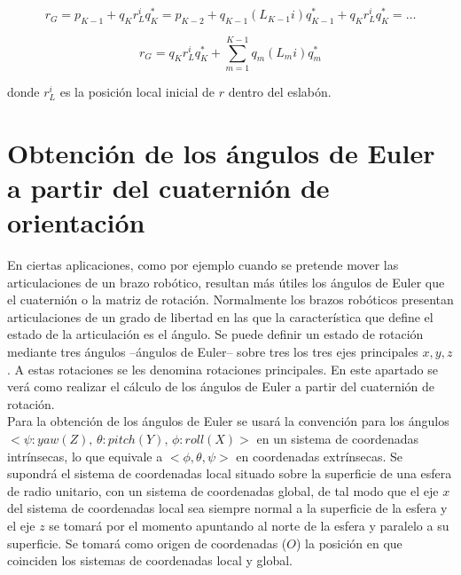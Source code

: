 \documentclass[12pt, a4paper]{report}
\begin{document}
$$ r_G = p_{K-1} + q_Kr_L^iq_K^* = p_{K-2} +  q_{K-1} (L_{K-1}i) q_{K-1}^* + q_K r_L^i q_K^* = \ldots $$

\begin{equation}
r_G = q_Kr_L^iq_K^* + \sum\limits_{m = 1}^{K-1} q_m (L_mi) q_m^*
\end{equation}

donde $r_L^i$ es la posición local inicial de $r$ dentro del eslabón.

\section{Obtención de los ángulos de Euler a partir del cuaternión de orientación}

En ciertas aplicaciones, como por ejemplo cuando se pretende mover las articulaciones de un brazo robótico, resultan más útiles los ángulos de Euler que el cuaternión o la matriz de rotación. Normalmente los brazos robóticos presentan articulaciones de un grado de libertad en las que la característica que define el estado de la articulación es el ángulo. Se puede definir un estado de rotación mediante tres ángulos --ángulos de Euler-- sobre tres los tres ejes principales $x, y, z$. A estas rotaciones se les denomina rotaciones principales. En este apartado se verá como realizar el cálculo de los ángulos de Euler a partir del cuaternión de rotación. \\

Para la obtención de los ángulos de Euler se usará la convención para los ángulos $<\psi: yaw (Z),\, \theta: pitch (Y),\, \phi: roll (X)>$ en un sistema de coordenadas intrínsecas, lo que equivale a $<\phi, \theta, \psi>$ en coordenadas extrínsecas. Se supondrá el sistema de coordenadas local situado sobre la superficie de una esfera de radio unitario, con un sistema de coordenadas global, de tal modo que el eje $x$ del sistema de coordenadas local sea siempre normal a la superficie de la esfera y el eje $z$ se tomará por el momento apuntando al norte de la esfera y paralelo a su superficie. Se tomará como origen de coordenadas ($O$) la posición en que coinciden los sistemas de coordenadas local y global.\\
\end{document}
